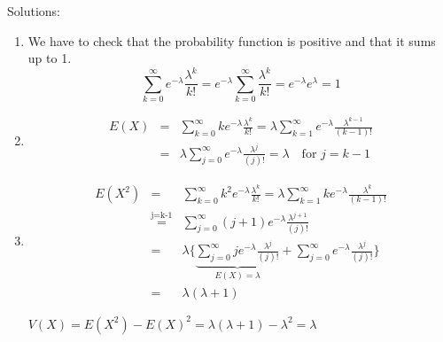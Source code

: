 \documentclass[12pt,thmsa]{article}
\begin{document}
\noindent Solutions:
\begin{enumerate}
  \item We have to check that the probability function is positive and that it sums up to 1.
  \begin{equation*}
  \sum_{k=0}^{\infty} e^{-\lambda} \frac{\lambda^{k}}{k!}=e^{-\lambda} \sum_{k=0}^{\infty} \frac{\lambda^{k}}{k!}=e^{-\lambda} e^{\lambda}=1
  \end{equation*}
  \item \begin{eqnarray*}
    E(X) &=& \sum_{k=0}^{\infty} k e^{-\lambda} \frac{\lambda^{k}}{k!} = \lambda \sum_{k=1}^{\infty}  e^{-\lambda}  \frac{\lambda^{k-1}}{(k-1)!} \\
    &=& \lambda \sum_{j=0}^{\infty}  e^{-\lambda}  \frac{\lambda^{j}}{(j)!} = \lambda  \quad \text{for } j=k-1
  \end{eqnarray*}

 \item  \begin{eqnarray*}
E(X^2) &=& \sum_{k=0}^{\infty} k^2 e^{-\lambda} \frac{\lambda^{k}}{k!} = \lambda \sum_{k=1}^{\infty} k e^{-\lambda} \frac{\lambda^{k}}{(k-1)!} \\ 
& \overset{\text{j=k-1}}{=} & \sum_{j=0}^{\infty} (j+1) e^{-\lambda}  \frac{\lambda^{j+1}}{(j)!} \\
&=& \lambda \{ \underbrace{\sum_{j=0}^{\infty} j e^{-\lambda}  \frac{\lambda^{j}}{(j)!}}_{E(X)=\lambda} + \sum_{j=0}^{\infty}  e^{-\lambda}  \frac{\lambda^{j}}{(j)!}\} \\
&=& \lambda (\lambda+1)
\end{eqnarray*}

  $ V(X) = E(X^2) - E(X)^2 = \lambda ( \lambda +1) - \lambda ^2 =\lambda $\\


\end{enumerate}
\end{document}
